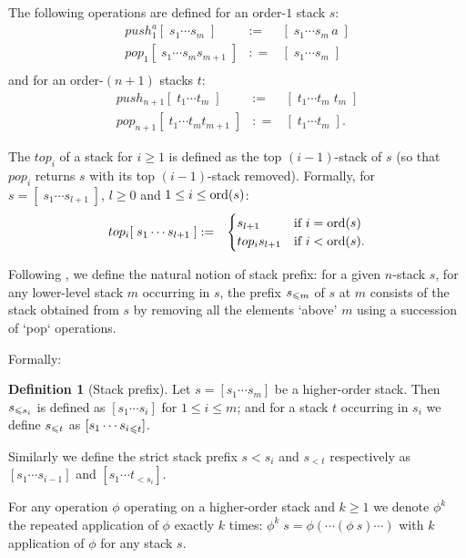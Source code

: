 \documentclass[a4paper]{article}[12pt]
\theoremstyle{remark}
\theoremstyle{definition}
\newtheorem{definition}{Definition}[section]
\begin{document}
The following operations are defined for an order-$1$ stack $s$:
\begin{eqnarray*}
	push_1^{a} [ \; s_1 \cdots s_m \; ] & := & [ \; s_1 \cdots s_m\, a \; ] \\
	pop_1 [ \; s_1 \cdots s_m s_{m+1} \; ] & : = & [ \; s_1 \cdots s_m \; ] \\
\end{eqnarray*}
and for an order-$(n+1)$ stacks $t$:
\begin{eqnarray*}
	push_{n+1} [ \; t_1 \cdots t_m \; ] & := & [ \; t_1 \cdots t_m\; t_m \; ] \\
	pop_{n+1} [ \; t_1 \cdots t_m t_{m+1} \; ] & : = & [ \; t_1 \cdots t_m \; ].
\end{eqnarray*}

The $top_i$ of a stack for $i\geq 1$ is defined as the top $(i-1)$-stack of $s$ (so that $pop_i$ returns $s$ with its top $(i-1)$-stack removed).
Formally, for $s=[ \; s_1 \cdots s_{l+1} \; ]$, $l\geq0$ and $1 \leq i\leq \mathop{\mathrm{ord}}(s)$:
\begin{eqnarray*}
	top_{i} [ \; s_1 \cdots s_{l+1} \; ] & := &
	\begin{cases}
		s_{l+1} & \mbox{if $i = \mathop{\mathrm{ord}}(s)$} \\
		top_i s_{l+1} & \mbox{if $i < \mathop{\mathrm{ord}}(s)$.}
	\end{cases}
\end{eqnarray*}


Following \cite{hmos-lics08}, we define the natural notion of stack prefix: for a given $n$-stack $s$, for any lower-level stack $m$ occurring in $s$, the prefix $s_{\leqslant m}$ of $s$ at $m$ consists of the stack obtained from $s$ by removing all the elements `above' $m$ using a succession of `pop` operations.

Formally:
\begin{definition}[Stack prefix]
Let $s = [s_1 \cdots s_m]$ be a higher-order stack. Then $s_{\leqslant s_i}$ is defined as $[s_1 \cdots s_i]$ for $1 \leq i \leq m$; and for a stack $t$ occurring in $s_i$ we define $s_{\leqslant t}$ as $[s_1 \cdots {s_i}_{\leqslant t}]$.

Similarly we define the strict stack prefix ${s}{< s_i}$ and $s_{<t}$ respectively as
 $[s_1 \cdots s_{i-1}]$ and $[s_1 \cdots t_{< s_{i}}]$.
\end{definition}

For any operation $\phi$ operating on a higher-order stack and $k\geq1$ we denote $\phi^k$ the repeated application of $\phi$ exactly $k$ times: $\phi^k\; s = \phi ( \cdots (\phi\ s) \cdots)$ with $k$ application of $\phi$ for any stack $s$.
\end{document}
